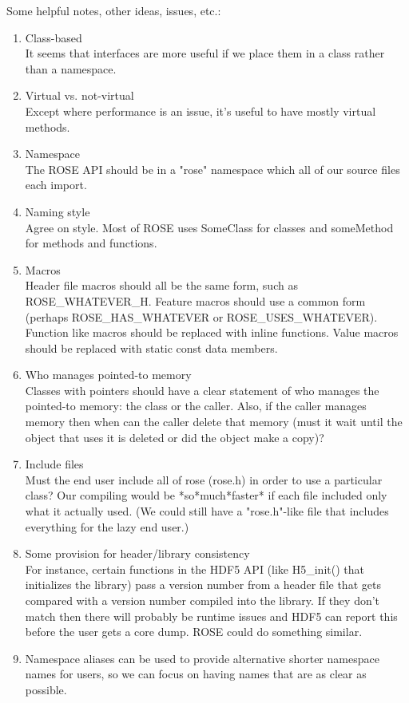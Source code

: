 Some helpful notes, other ideas, issues, etc.:
\begin{enumerate}
   \item Class-based \\
	It seems that interfaces are more useful if we place them in a
	class rather than a namespace.

   \item Virtual vs. not-virtual \\
	Except where performance is an issue, it's useful to have
	mostly virtual methods.

   \item Namespace \\
	The ROSE API should be in a "rose" namespace which all of our
	source files each import.

   \item Naming style \\
	Agree on style. Most of ROSE uses SomeClass for classes and
	someMethod for methods and functions.

   \item Macros \\
	Header file macros should all be the same form, such as
	ROSE\_WHATEVER\_H.  Feature macros should use a common form
	(perhaps ROSE\_HAS\_WHATEVER or ROSE\_USES\_WHATEVER). Function
	like macros should be replaced with inline functions. Value
	macros should be replaced with static const data members.

   \item Who manages pointed-to memory \\
	Classes with pointers should have a clear statement of who
	manages the pointed-to memory: the class or the caller. Also,
	if the caller manages memory then when can the caller delete
	that memory (must it wait until the object that uses it is
	deleted or did the object make a copy)?

   \item Include files \\
	Must the end user include all of rose (rose.h) in order to use
	a particular class?  Our compiling would be *so*much*faster*
	if each file included only what it actually used. (We could
	still have a "rose.h"-like file that includes everything for
	the lazy end user.)

   \item Some provision for header/library consistency \\
	For instance, certain functions in the HDF5 API (like H5\_init()
	that initializes the library) pass a version number from a
	header file that gets compared with a version number compiled
	into the library. If they don't match then there will probably
	be runtime issues and HDF5 can report this before the user
	gets a core dump.  ROSE could do something similar.

   \item Namespace aliases can be used to provide alternative shorter
   namespace names for users, so we can focus on having names that are
   as clear as possible.
\end{enumerate}

